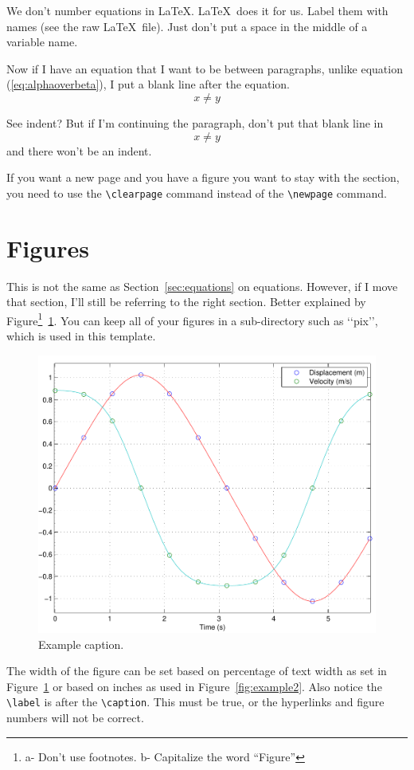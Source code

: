 \documentclass[12pt]{report}
\begin{document}
We don't number equations in \LaTeX. \LaTeX\ does it for us. Label them with names (see the raw \LaTeX\ file).   Just don't put a space in the middle of a variable name. 

Now if I have an equation that I want to be between paragraphs, unlike equation (\ref{eq:alphaoverbeta}), I put a blank line after the equation.
\begin{equation}
  \label{eq:anothersillyequation}
  x\neq y
\end{equation}

See  indent? But if I'm continuing the paragraph, don't put that blank line in
\begin{equation}
  \label{eq:anothersillyequation2}
  x\neq y
\end{equation}
and there won\rq{}t be an indent.

If you want a new page and you have a figure you want to stay with the section, you need to use the \verb'\clearpage' command instead of the \verb'\newpage' command.  

\section{Figures}
This is not the same as Section~\ref{sec:equations} on equations. However, if I move that section, I'll still be referring to the right section. 
Better explained by Figure\footnote{a- Don't use footnotes. b- Capitalize the word ``Figure''}~\ref{fig:example}.  You can keep all of your figures in a sub-directory such as \lq\lq{}pix\rq\rq{}, which is used in this template.
\begin{figure}[htbp] %
   \centering
   \includegraphics[width=.5\textwidth]{pix/example} %
   \caption{Example caption.}
\label{fig:example}
\end{figure}

The width of the figure can be set based on percentage of text width as set in Figure~\ref{fig:example} or based on inches as used in Figure~\ref{fig:example2}.  Also notice the \verb'\label' is after the \verb'\caption'.  This must be true, or the hyperlinks and figure numbers will not be correct.
\end{document}
